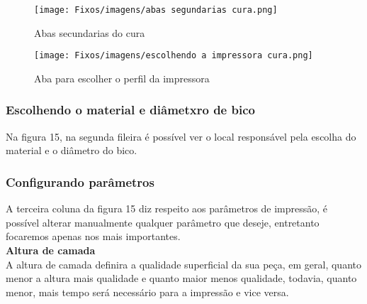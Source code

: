 \begin{figure}[h!]

    \centering

    \texttt{[image: Fixos/imagens/abas segundarias cura.png]}

    \caption{Abas secundarias do cura}

    \label{fig:my_label}

\end{figure}



\begin{figure}[h!]

    \centering

    \texttt{[image: Fixos/imagens/escolhendo a impressora cura.png]}

    \caption{Aba para escolher o perfil da impressora}

    \label{fig:my_label}

\end{figure}



\subsubsection{Escolhendo o material e diâmetxro de bico}

Na figura 15, na segunda fileira é possível ver o local responsável pela escolha do material e o diâmetro do bico.\\[0.2cm]



\subsubsection{Configurando parâmetros}



A terceira coluna da figura 15 diz respeito aos parâmetros de impressão, é possível alterar manualmente qualquer parâmetro que deseje, entretanto focaremos apenas nos mais importantes.\\[0.2cm]



\textbf{Altura de camada}\\[0.2cm]

A altura de camada definira a qualidade superficial da sua peça, em geral, quanto menor a altura mais qualidade e quanto maior menos qualidade, todavia, quanto menor, mais tempo será necessário para a impressão e vice versa.\\




